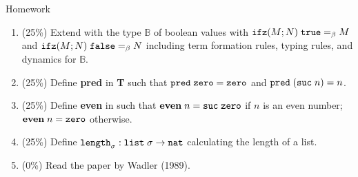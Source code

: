 \begin{frame}{Homework}
  \begin{enumerate}
    \item (25\%) Extend {\PCF} with the type $\mathbb{B}$ of boolean values with
      $\mathtt{ifz}(M; N)\;\mathtt{true} =_\beta M$ and $\mathtt{ifz}(M; N)\;\mathtt{false}
      =_\beta N$ including term formation rules, typing rules, and dynamics for
      $\mathbb{B}$.

    \item (25\%) Define \textbf{pred} in {\textbf{T}} such that $\mathtt{pred}\;\mathtt{zero} =\mathtt{zero}$
      and $\mathtt{pred}\;(\mathtt{suc}\;n) = n$.

    \item (25\%) Define \textbf{even} in {\PCF} such that $\mathbf{even}\;n =
      \mathtt{suc}\;\mathtt{zero}$ if $n$ is an even number; $\mathbf{even}\;n = \mathtt{zero}$
      otherwise. 

    \item (25\%) Define $\mathtt{length}_\sigma : \mathtt{list}\;\sigma \to \mathtt{nat}$ calculating the length of a list.
    \item (0\%) Read the paper by Wadler (1989).
    
  \end{enumerate}
  
\end{frame}

%
% 


